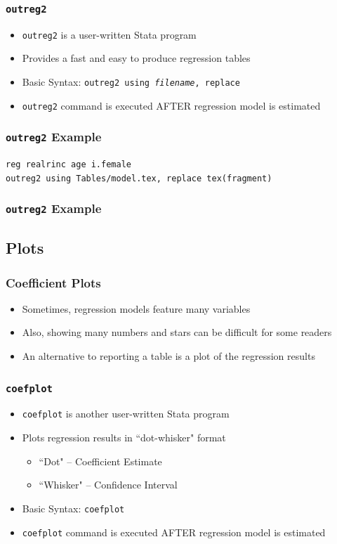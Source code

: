 \documentclass{beamer}
\begin{document}
\begin{frame}
	\frametitle{\texttt{outreg2}}
		\begin{itemize}
			\item \texttt{outreg2} is a user-written Stata program
			\item Provides a fast and easy to produce regression tables
			\item Basic Syntax: \texttt{outreg2 using \textit{filename}, replace}
			\item \texttt{outreg2} command is executed AFTER regression model is estimated
		\end{itemize}
\end{frame}

\begin{frame}
	\frametitle{\texttt{outreg2} Example}
		\texttt{reg realrinc age i.female}\\
		\texttt{outreg2 using Tables/model.tex, replace tex(fragment)}
\end{frame}

\begin{frame}
	\frametitle{\texttt{outreg2} Example}
		
\end{frame}

\subsection{Plots}

\begin{frame}
	\frametitle{Coefficient Plots}
		\begin{itemize}
			\item Sometimes, regression models feature many variables
			\item Also, showing many numbers and stars can be difficult for some readers
			\item An alternative to reporting a table is a plot of the regression results
		\end{itemize}
\end{frame}

\begin{frame}
	\frametitle{\texttt{coefplot}}
		\begin{itemize}
			\item \texttt{coefplot} is another user-written Stata program
			\item Plots regression results in ``dot-whisker" format
				\begin{itemize}
					\item ``Dot" -- Coefficient Estimate
					\item ``Whisker" -- Confidence Interval
				\end{itemize}
			\item Basic Syntax: \texttt{coefplot}
			\item \texttt{coefplot} command is executed AFTER regression model is estimated
		\end{itemize}
\end{frame}
\end{document}
